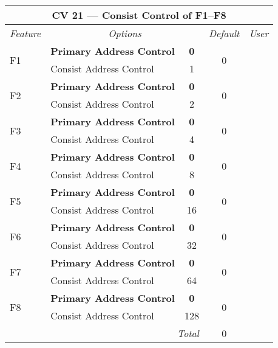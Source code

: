 \documentclass[12pt,letterpaper,draft]{memoir} %
\begin{document}
\label{CV21}
\begin{center}
\begin{tabular}{|l|lc|c|c|}
\hline
\multicolumn{5}{|c|}{\textbf{CV 21 --- Consist Control of F1--F8}} \\ \hline \hline
\textit{Feature} & \multicolumn{2}{c|}{\textit{Options}} & \textit{Default} & \textit{User} \\ \hline
\multirow{2}{*}{F1} & \textbf{Primary Address Control} & \textbf{0}	& 	\multirow{2}{*}{0}& \\
                           & Consist Address Control & 1 & & \\ \hline
\multirow{2}{*}{F2} & \textbf{Primary Address Control} & \textbf{0}	& 	\multirow{2}{*}{0}& \\
                           & Consist Address Control & 2 & & \\ \hline
\multirow{2}{*}{F3} & \textbf{Primary Address Control} & \textbf{0}	& 	\multirow{2}{*}{0}& \\
                           & Consist Address Control & 4 & & \\ \hline
\multirow{2}{*}{F4} & \textbf{Primary Address Control} & \textbf{0}	& 	\multirow{2}{*}{0}& \\
                           & Consist Address Control & 8 & & \\ \hline
\multirow{2}{*}{F5} & \textbf{Primary Address Control} & \textbf{0}	& 	\multirow{2}{*}{0}& \\
                           & Consist Address Control & 16 & & \\ \hline
\multirow{2}{*}{F6} & \textbf{Primary Address Control} & \textbf{0}	& 	\multirow{2}{*}{0}& \\
                           & Consist Address Control & 32 & & \\ \hline
\multirow{2}{*}{F7} & \textbf{Primary Address Control} & \textbf{0}	& 	\multirow{2}{*}{0}& \\
                           & Consist Address Control & 64 & & \\ \hline
\multirow{2}{*}{F8} & \textbf{Primary Address Control} & \textbf{0}	& 	\multirow{2}{*}{0}& \\
                           & Consist Address Control & 128 & & \\ \hline\hline
\multicolumn{3}{|r|}{\textit{Total}} & 0 &\\ \hline
\end{tabular}
\end{center}
\end{document}
